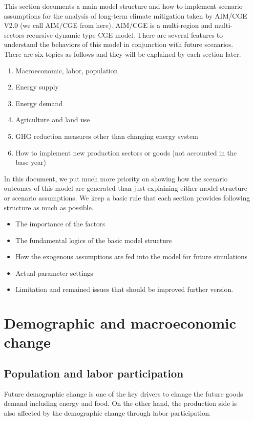 \documentclass[10pt,a4paper,titlepage,dvipdfmx]{book}
\begin{document}
\begin{itemize}
This section documents a main model structure and how to implement scenario assumptions for the analysis of long-term climate mitigation taken by AIM/CGE V2.0 (we call AIM/CGE from here). AIM/CGE is a multi-region and multi-sectors recursive dynamic type CGE model. There are several features to understand the behaviors of this model in conjunction with future scenarios. There are six topics as follows and they will be explained by each section later.
\begin{enumerate}[{1)}]
\item {Macroeconomic, labor, population}
\item {Energy supply}
\item {Energy demand} 
\item {Agriculture and land use}
\item {GHG reduction measures other than changing energy system}
\item {How to implement new production sectors or goods (not accounted in the base year)}
\end{enumerate}
{In this document, we put much more priority on showing how the scenario outcomes of this model are generated than just explaining either model structure or scenario assumptions. We keep a basic rule that each section provides following structure as much as possible.}
\begin{itemize}
\item  {The importance of the factors}
\item  {The fundamental logics of the basic model structure} 
\item  {How the exogenous assumptions are fed into the model for future simulations}
\item  {Actual parameter settings}
\item  {Limitation and remained issues that should be improved further version.}
\end{itemize}
\section{\label{sec:DemMacCha}Demographic and macroeconomic change }

\subsection{\label{subsec:PopLabPar}Population and labor participation}

Future demographic change is one of the key drivers to change the future goods demand including energy and food. On the other hand, the production side is also affected by the demographic change through labor participation.


\end{itemize}
\end{document}
